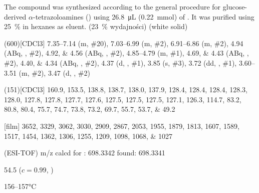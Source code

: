 The compound was synthesized according to the general procedure for glucose-derived $\alpha$-tetrazoloamines () using \SI{26.8}{\micro\liter} (\SI{0.22}{\milli\mol}) of .
It was purified using \SI{25}{\percent}  in hexanes as eluent.
(\SI{23}{\percent} wydajności) (white solid)
\begin{fullexp}
	\NMR(600)[CDCl3] \numrange{7.35}{7.14} (m, \#{20}), \numrange{7.03}{6.99} (m, \#{2}), \numrange{6.91}{6.86} (m, \#{2}), \num{4.94} (ABq, , \#{2}), \numlist{4.92;4.56} (ABq, , \#{2}), \numrange{4.85}{4.79} (m, \#{1}), \numlist{4.69;4.43} (ABq, , \#{2}), \numlist{4.40;4.34} (ABq, , \#{2}), \num{4.37} (d, , \#{1}), \num{3.85} (s, \#{3}), \num{3.72} (dd, , \#{1}), \numrange{3.60}{3.51} (m, \#{2}), \num{3.47} (d, , \#{2})\par\noindent
	(151)[CDCl3] \numlist{160.9; 153.5; 138.8; 138.7; 138.0; 137.9; 128.4; 128.4; 128.4; 128.3; 128.0; 127.8; 127.8; 127.7; 127.6; 127.5; 127.5; 127.5; 127.1; 126.3; 114.7; 83.2; 80.8; 80.4; 75.7; 74.7; 73.8; 73.2; 69.7; 55.7; 53.7; 49.2}\par\noindent
	[film] \numlist{3652; 3329; 3062; 3030; 2909; 2867; 2053; 1955; 1879; 1813; 1607; 1589; 1517; 1454; 1362; 1306; 1255; 1209; 1098; 1068; 1027}\par\noindent
	 (ESI-TOF) m/z calcd for : \num{698.3342} found: \num{698.3341}\par\noindent
	\data{[$\alpha^{23}_D$]~$=$} \num{54.5} ($c = 0.99$, )\par\noindent
	 \numrange{156}{157}\si{\celsius}
\end{fullexp}

